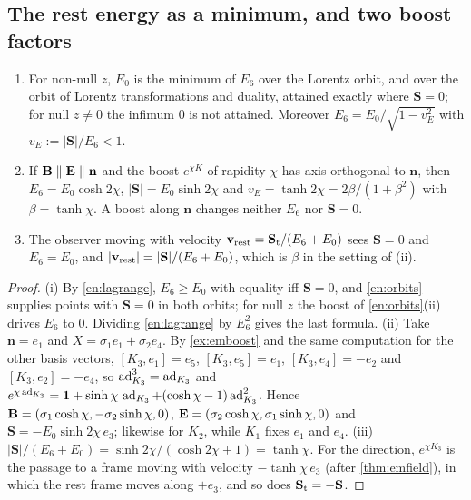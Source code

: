 \subsection{The rest energy as a minimum, and two boost factors}
\label{sec:energy-min}

\begin{theorem}
\label{en:min}
\begin{enumerate}[label=(\roman*),leftmargin=2.2em]
\item For non-null $z$, $E_0$ is the minimum of $E_6$ over the Lorentz orbit, and over the orbit of Lorentz transformations and duality,
attained exactly where $\mathbf S=0$; for null $z\neq0$ the infimum $0$ is not attained. Moreover $E_6=E_0/\sqrt{1-v_E^2}$ with $v_E:=|\mathbf S|/E_6<1$.
\item If $\mathbf B\parallel\mathbf E\parallel\mathbf n$ and the boost $e^{\chi K}$ of rapidity $\chi$ has axis orthogonal to $\mathbf n$, then
$E_6=E_0\cosh2\chi$, $|\mathbf S|=E_0\sinh2\chi$ and $v_E=\tanh2\chi=2\beta/(1+\beta^2)$ with $\beta=\tanh\chi$. A boost along $\mathbf n$ changes
neither $E_6$ nor $\mathbf S=0$.
\item The observer moving with velocity $\mathbf v_{\rm rest}=\mathbf S_{\rm t}/(E_6+E_0)$ sees $\mathbf S=0$ and $E_6=E_0$, and
$|\mathbf v_{\rm rest}|=|\mathbf S|/(E_6+E_0)$, which is $\beta$ in the setting of (ii).
\end{enumerate}
\end{theorem}

\begin{proof}
(i) By \eqref{en:lagrange}, $E_6\ge E_0$ with equality iff $\mathbf S=0$, and \cref{en:orbits} supplies points with $\mathbf S=0$ in both orbits; for null
$z$ the boost of \cref{en:orbits}(ii) drives $E_6$ to $0$. Dividing \eqref{en:lagrange} by $E_6^2$ gives the last formula. (ii) Take $\mathbf n=e_1$
and $X=\sigma_1e_1+\sigma_2e_4$. By \cref{ex:emboost} and the same computation for the other basis vectors, $[K_3,e_1]=e_5$, $[K_3,e_5]=e_1$,
$[K_3,e_4]=-e_2$ and $[K_3,e_2]=-e_4$, so $\operatorname{ad}_{K_3}^3=\operatorname{ad}_{K_3}$ and $e^{\chi\operatorname{ad}_{K_3}}=\mathbf 1+\sinh\chi\,\operatorname{ad}_{K_3}+(\cosh\chi-1)\operatorname{ad}_{K_3}^2$. Hence
$\mathbf B=(\sigma_1\cosh\chi,-\sigma_2\sinh\chi,0)$, $\mathbf E=(\sigma_2\cosh\chi,\sigma_1\sinh\chi,0)$ and $\mathbf S=-E_0\sinh2\chi\,e_3$; likewise for $K_2$,
while $K_1$ fixes $e_1$ and $e_4$. (iii) $|\mathbf S|/(E_6+E_0)=\sinh2\chi/(\cosh2\chi+1)=\tanh\chi$. For the direction, $e^{\chi K_3}$ is the passage to
a frame moving with velocity $-\tanh\chi\,e_3$ (after \cref{thm:emfield}), in which the rest frame moves along $+e_3$, and so does
$\mathbf S_{\rm t}=-\mathbf S$.
\end{proof}

